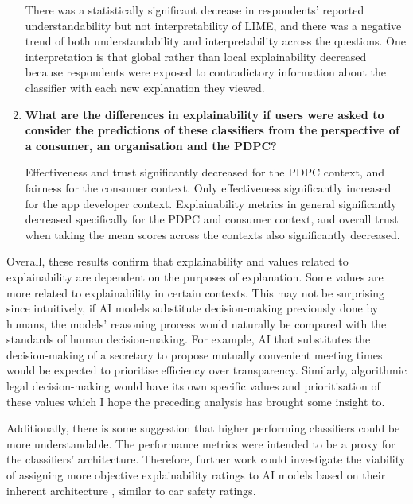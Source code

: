 \begin{enumerate}
    There was a statistically significant decrease in respondents' reported understandability but not interpretability of LIME, and there was a negative trend of both understandability and interpretability across the questions. One interpretation is that global rather than local explainability decreased because respondents were exposed to contradictory information about the classifier with each new explanation they viewed.

    \item \textbf{What are the differences in explainability if users were asked to consider the predictions of these classifiers from the perspective of a consumer, an organisation and the PDPC?}
    
    Effectiveness and trust significantly decreased for the PDPC context, and fairness for the consumer context. Only effectiveness significantly increased for the app developer context. Explainability metrics in general significantly decreased specifically for the PDPC and consumer context, and overall trust when taking the mean scores across the contexts also significantly decreased.
\end{enumerate}

Overall, these results confirm that explainability and values related to explainability are dependent on the purposes of explanation. Some values are more related to explainability in certain contexts. This may not be surprising since intuitively, if AI models substitute decision-making previously done by humans, the models' reasoning process would naturally be compared with the standards of human decision-making. For example, AI that substitutes the decision-making of a secretary to propose mutually convenient meeting times would be expected to prioritise efficiency over transparency. Similarly, algorithmic legal decision-making would have its own specific values and prioritisation of these values which I hope the preceding analysis has brought some insight to.

Additionally, there is some suggestion that higher performing classifiers could be more understandable. The performance metrics were intended to be a proxy for the classifiers' architecture. Therefore, further work could investigate the viability of assigning more objective explainability ratings to AI models based on their inherent architecture \cite{waltl2018}, similar to car safety ratings.

